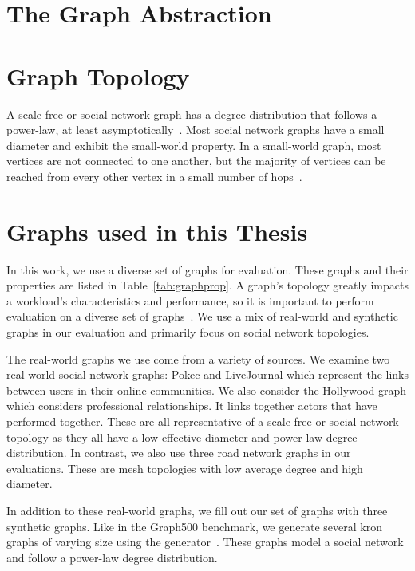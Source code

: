 \section{The Graph Abstraction}\label{thesis:background:graphproc}
\section{Graph Topology}\label{thesis:background:topology}
A scale-free or social network graph has a degree distribution that follows a power-law, at least asymptotically~\cite{barabasi1999emergence}.
Most social network graphs have a small diameter and exhibit the small-world property. 
In a small-world graph, most vertices are not connected to one another, but the majority of vertices can be reached from every other vertex in a small number of hops~\cite{watts1998collective}.
~\cite{milgram1967small}

\section{Graphs used in this Thesis}\label{thesis:background:graphs}
In this work, we use a diverse set of graphs for evaluation.
These graphs and their properties are listed in Table~\ref{tab:graphprop}.
A graph's topology greatly impacts a workload's characteristics and performance, so it is important to perform evaluation on a diverse set of graphs~\cite{beamer2015locality}.
We use a mix of real-world and synthetic graphs in our evaluation and primarily focus on social network topologies. 

The real-world graphs we use come from a variety of sources. 
We examine two real-world social network graphs: Pokec and LiveJournal which represent the links between users in their online communities. 
We also consider the Hollywood graph which considers professional relationships.
It links together actors that have performed together.
These are all representative of a scale free or social network topology as they all have a low effective diameter and power-law degree distribution.
In contrast, we also use three road network graphs in our evaluations. 
These are mesh topologies with low average degree and high diameter. 

In addition to these real-world graphs, we fill out our set of graphs with three synthetic graphs.
Like in the Graph500 benchmark, we generate several kron graphs of varying size using the \kron generator~\cite{murphy2010graph500}.
These graphs model a social network and follow a power-law degree distribution. 



